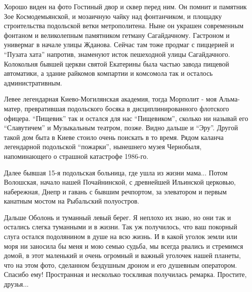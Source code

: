 Хорошо виден на фото Гостиный двор и сквер перед ним. Он помнит и памятник Зое
Космодемьянской, и мозаичную чайку над фонтанчиком, и площадку строительства
подольской ветки метрополитена. Ныне он украшен современным фонтаном и
великолепным памятником гетману Сагайдачному. Гастроном и универмаг в начале
улицы Жданова. Сейчас там тоже продмаг с пиццерией и \enquote{Пузата хата}
напротив, знаменуют исток пешеходной улицы Сагайдачного. Колокольня бывшей
церкви святой Екатерины была частью завода пищевой автоматики, а здание
райкомов компартии и комсомола так и осталось административным. 

Левее легендарная Киево-Могилянская академия, тогда Морполит - моя Альма-матер,
превратившая подольского босяка в дисциплинированного флотского офицера.
\enquote{Пищевик} так и остался для нас \enquote{Пищевиком}, сколько ни называй
его \enquote{Славутичем} и Музыкальным театром, позже. Видно дальше и
\enquote{Эру}. Другой такой дом быта в Киеве стоило очень поискать в то время.
Рядом каланча легендарной подольской \enquote{пожарки}, нынешнего музея
Чернобыля, напоминающего о страшной катастрофе 1986-го. 

Далее бывшая 15-я подольская больница, где ушла из жизни мама... Потом
Волошская, начало нашей Почайнинской, с древнейшей Ильинской церковью,
набережная, Днепр и гавань с бывшим речпортом, за элеватором и первым канатным
мостом на Рыбальский полуостров. 

Дальше Оболонь и туманный левый берег. Я неплохо их знаю, но они так и остались
слегка туманными и в жизни. Так уж получилось, что ваш покорный слуга остался
подолянином в душе на всю жизнь. И в какой уголок земли или моря ни заносила бы
меня и мою семью судьба, мы всегда рвались и стремимся домой, в этот маленький
и очень огромный и важный уголочек нашей планеты, что на этом фото, сделанном
бездушным дроном и его душевным оператором. Спасибо ему!  Пространная и
несколько тоскливая получилась ремарка. Простите, друзья...

